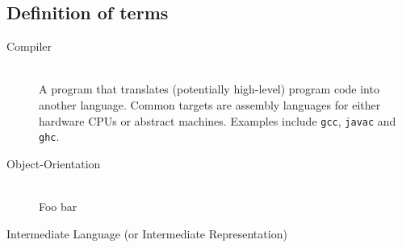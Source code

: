 \subsection{Definition of terms}
\begin{description}
\item[Compiler] \hfill \\
  A program that translates (potentially high-level) program code into
  another language. Common targets are assembly languages for either
  hardware CPUs or abstract machines. Examples include
  \texttt{gcc}\cite{NEEDED}, \texttt{javac}\cite{NEEDED} and
  \texttt{ghc}\cite{NEEDED}.

\item[Object-Orientation] \hfill \\
  Foo bar

\item[Intermediate Language (or Intermediate Representation)] \hfill \\

\end{description}